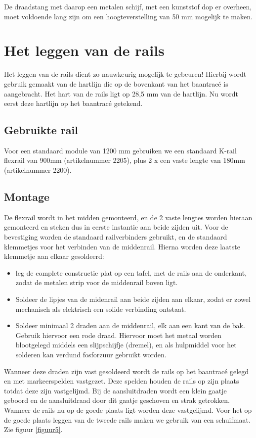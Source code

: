 \documentclass[12pt,a4paper]{report}
\newcommand*{\trace}{trac\'{e} }
\begin{document}
De draadstang met daarop een metalen schijf,  met een kunststof dop er overheen, moet voldoende lang zijn om een hoogteverstelling van 50 mm mogelijk te maken.

\chapter{Het leggen van de rails}

Het leggen van de rails dient zo nauwkeurig mogelijk te gebeuren! Hierbij wordt gebruik gemaakt van de hartlijn die op de bovenkant van het baan\trace is aangebracht.
Het hart van de rails ligt op 28,5 mm van de hartlijn. Nu wordt eerst deze hartlijn op het baan\trace getekend.

\section{Gebruikte rail}
Voor een standaard module van 1200 mm gebruiken we een standaard K-rail flexrail van 900mm (artikelnummer 2205), plus 2 x een vaste lengte van 180mm (artikelnummer 2200).

\section{Montage}
De flexrail wordt in het midden gemonteerd, en de 2 vaste lengtes worden hieraan gemonteerd en steken dus in eerste instantie aan beide zijden uit. Voor de bevestiging worden de standaard railverbinders gebruikt, en de standaard klemmetjes voor het verbinden van de middenrail. Hierna worden deze laatste klemmetje aan elkaar gesoldeerd:

\begin{itemize}
\item leg de complete constructie plat op een tafel, met de rails aan de onderkant, zodat de metalen strip voor de middenrail boven ligt.
\item Soldeer de lipjes van de midenrail aan beide zijden aan elkaar, zodat er zowel mechanisch als elektrisch een solide verbinding ontstaat.
\item Soldeer minimaal 2 draden aan de middenrail, elk aan een kant van de bak. Gebruik hiervoor een rode draad. Hiervoor moet het metaal worden blootgelegd middels een slijpschijfje (dremel), en als hulpmiddel voor het solderen kan verdund fosforzuur gebruikt worden.
\end{itemize}

Wanneer deze draden zijn vast gesoldeerd wordt de rails op het baan\trace gelegd en met markeerspelden vastgezet. Deze spelden houden de rails op zijn plaats totdat deze zijn vastgelijmd. Bij de aansluitdraden wordt een klein gaatje geboord en de aansluitdraad door dit gaatje geschoven en strak getrokken. Wanneer de rails nu op de goede plaats ligt worden deze vastgelijmd. Voor het op de goede plaats leggen van de tweede rails maken we gebruik van een schuifmaat. Zie figuur \ref{figuur5}.
\end{document}

